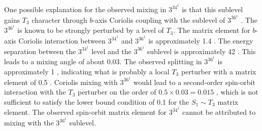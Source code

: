 \documentclass[12pt]{mitthesis}
\begin{document}
One possible explanation for the observed mixing in $3^34^1$ 
is that this sublevel gains $T_3$ character through $b$-axis Coriolis
coupling with the  sublevel of $3^36^1$ .  The $3^36^1$
 is known to be strongly perturbed by a level of $T_3$.  The
matrix element for $b$-axis Coriolis interaction between $3^34^1$
 and $3^36^1$  is approximately 1.4 \rcm.  The energy
separation between the $3^34^1$  level and the $3^36^1$ 
sublevel is approximately 42 \rcm.  This leads to a mixing angle of
about 0.03.  The observed splitting in $3^36^1$  is
approximately 1 \rcm, indicating what is probably a local $T_3$
perturber with a matrix element of 0.5 \rcm.  Coriolis mixing with
$3^36^1$  would lead to a second-order spin-orbit interaction
with the $T_3$ perturber on the order of $0.5 \times 0.03 = 0.015$
\rcm, which is not sufficient to satisfy the lower bound condition of
0.1 \rcm for the $S_1 \sim T_3$ matrix element.  The observed
spin-orbit matrix element for $3^34^1$  cannot be attributed to
mixing with the $3^36^1$  sublevel.


\end{document}
